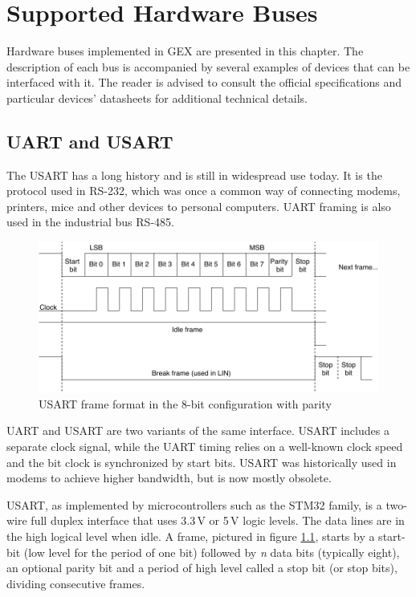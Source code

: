 \chapter{Supported Hardware Buses} \label{ch:hw_buses}

Hardware buses implemented in GEX are presented in this chapter. The description of each bus is accompanied by several examples of devices that can be interfaced with it. The reader is advised to consult the official specifications and particular devices' datasheets for additional technical details.

\section{UART and USART} \label{sec:theory-usart}

The \acrfull{USART} has a long history and is still in widespread use today. It is the protocol used in RS-232, which was once a common way of connecting modems, printers, mice and other devices to personal computers. \gls{UART} framing is also used in the industrial bus RS-485.

\begin{figure}[h]
	\centering
	\includegraphics[scale=.9] {img/uart-frame-redraw.pdf}
	\caption[UART frame format]{\label{fig:uart-frame}\gls{USART} frame format in the 8-bit configuration with parity}
\end{figure}

\gls{UART} and \gls{USART} are two variants of the same interface. \gls{USART} includes a separate clock signal, while the \gls{UART} timing relies on a well-known clock speed and the bit clock is synchronized by start bits. \gls{USART} was historically used in modems to achieve higher bandwidth, but is now mostly obsolete.

\gls{USART}, as implemented by microcontrollers such as the STM32 family, is a two-wire full duplex interface that uses 3.3\,V or 5\,V logic levels. The data lines are in the high logical level when idle. A frame, pictured in figure \ref{fig:uart-frame}, starts by a start-bit (low level for the period of one bit) followed by \textit{n} data bits (typically eight), an optional parity bit and a period of high level called a stop bit (or stop bits), dividing consecutive frames.

